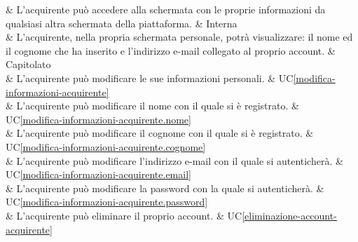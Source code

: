  & L'acquirente può accedere alla schermata con le proprie informazioni da qualsiasi altra schermata della piattaforma. & Interna \\

 & L'acquirente, nella propria schermata personale, potrà visualizzare: il nome ed il cognome che ha inserito e l'indirizzo e-mail collegato al proprio account. & Capitolato \\

 & L'acquirente può modificare le sue informazioni personali. & UC\ref{modifica-informazioni-acquirente} \\

 & L'acquirente può modificare il nome con il quale si è registrato. & UC\ref{modifica-informazioni-acquirente.nome} \\

 & L'acquirente può modificare il cognome con il quale si è registrato. & UC\ref{modifica-informazioni-acquirente.cognome} \\

 & L'acquirente può modificare l'indirizzo e-mail con il quale si autenticherà. & UC\ref{modifica-informazioni-acquirente.email} \\

 & L'acquirente può modificare la password con la quale si autenticherà. & UC\ref{modifica-informazioni-acquirente.password} \\

 & L'acquirente può eliminare il proprio account. & UC\ref{eliminazione-account-acquirente} \\







